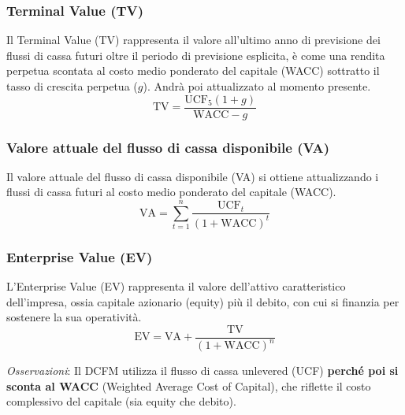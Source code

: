 \documentclass[a4paper,10pt]{article}
\begin{document}
\subsubsection*{Terminal Value (TV)}
Il Terminal Value (TV) rappresenta il valore all'ultimo anno di previsione dei flussi di cassa futuri oltre il periodo di previsione esplicita, è come una rendita perpetua scontata al costo medio ponderato del capitale (WACC) sottratto il tasso di crescita perpetua ($g$).
Andrà poi attualizzato al momento presente.
\[\text{TV} = \frac{\text{UCF}_{5}(1+g)}{\text{WACC} - g}\]

\subsubsection*{Valore attuale del flusso di cassa disponibile (VA)}
Il valore attuale del flusso di cassa disponibile (VA) si ottiene attualizzando i flussi di cassa futuri al costo medio ponderato del capitale (WACC).
\[\text{VA} = \sum_{t=1}^{n} \frac{\text{UCF}_t}{(1 + \text{WACC})^t}\]
\subsubsection*{Enterprise Value (EV)}
L'Enterprise Value (EV) rappresenta il valore dell'attivo caratteristico dell'impresa, ossia capitale azionario (equity) più il debito, con cui si finanzia per sostenere la sua operatività. 
\[\text{EV} = \text{VA} + \frac{\text{TV}}{(1+\text{WACC})^n} \]

\textit{Osservazioni}: Il DCFM utilizza il flusso di cassa unlevered (UCF) \textbf{perché poi si sconta al WACC} (Weighted Average Cost of Capital), che riflette il costo complessivo del capitale (sia equity che debito). 
\end{document}

